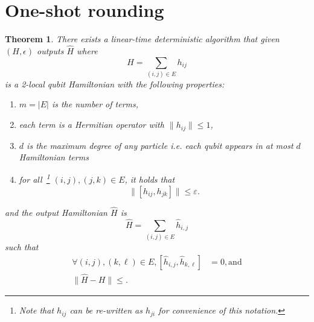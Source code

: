 \documentclass[11pt]{article}
\theoremstyle{plain}
\newtheorem{theorem}{Theorem}[section]
\newcommand{\eps}{\varepsilon}
\begin{document}
\section{One-shot rounding}
\begin{theorem}
There exists a linear-time deterministic algorithm that given $(H, \epsilon)$ outputs $\widehat{H}$ where
\[ H = \sum_{(i,j) \in E} h_{ij}\] is a 2-local qubit Hamiltonian with the following properties:
\begin{enumerate}
    \item $m = |E|$ is the number of terms,
    \item each term is a Hermitian operator with $\| h_{ij} \| \leq 1$,
    \item $d$ is the maximum degree of any particle i.e. each qubit appears in at most $d$ Hamiltonian terms
    \item for all~\footnote{Note that $h_{ij}$ can be re-written as $h_{ji}$ for convenience of this notation.} $(i,j), (j,k) \in E$, it holds that
\[ \| [h_{ij}, h_{jk} ] \| \leq \eps. \]
\end{enumerate}
and the output Hamiltonian $\widehat{H}$ is
\[ \widehat{H} = \sum_{(i,j) \in E} \widehat{h}_{i,j}\]
such that
\begin{align} 
\forall (i,j), (k,\ell) \in E, [\widehat{h}_{i,j}, \widehat{h}_{k,\ell}] &= 0, \text{and} \label{eq:exact-commutation} \\ 
\|\widehat{H} - H\|\leq .\label{eq:rounding-error}
\end{align}
\end{theorem}
\end{document}
